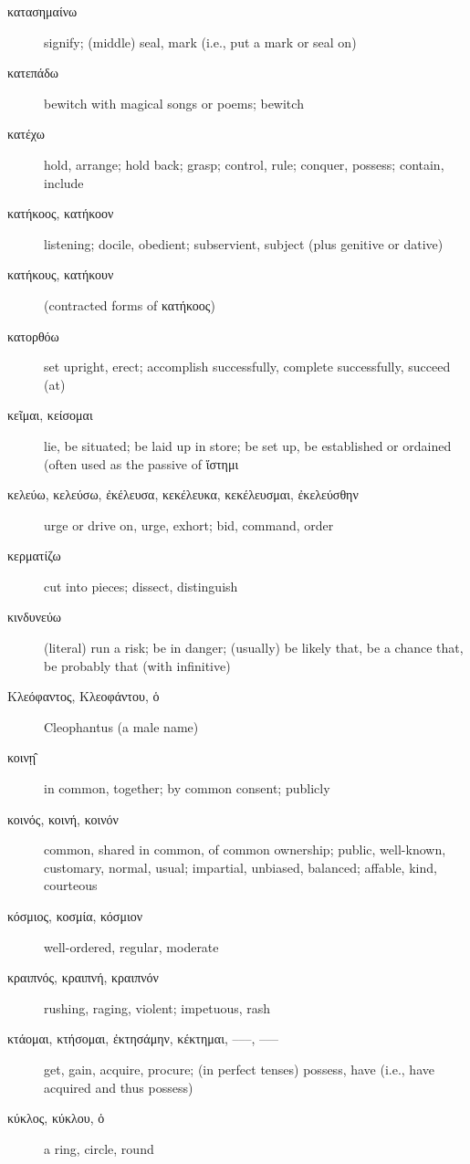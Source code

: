 \documentclass[12pt,letterpaper]{article}
\begin{document}
\begin{description}
    \item[\textgreek{κατασημαίνω}] signify; (middle) seal, mark (i.e., put a mark or seal on)
    \item[\textgreek{κατεπάδω}] bewitch with magical songs or poems; bewitch
    \item[\textgreek{κατέχω}] hold, arrange; hold back; grasp; control, rule; conquer, possess; contain, include
    \item[\textgreek{κατήκοος, κατήκοον}] listening; docile, obedient; subservient, subject (plus genitive or dative)
    \item[\textgreek{κατήκους, κατήκουν}] (contracted forms of \textgreek{κατήκοος})
    \item[\textgreek{κατορθόω}] set upright, erect; accomplish successfully, complete successfully, succeed (at)
    \item[\textgreek{κεῖμαι, κείσομαι}] \marginnote{*}lie, be situated; be laid up in store; be set up, be established or ordained (often used as the passive of \textgreek{ἵστημι}
    \item[\textgreek{κελεύω, κελεύσω, ἐκέλευσα, κεκέλευκα, κεκέλευσμαι, ἐκελεύσθην}] \marginnote{*}urge or drive on, urge, exhort; bid, command, order
    \item[\textgreek{κερματίζω}] cut into pieces; dissect, distinguish
    \item[\textgreek{κινδυνεύω}] (literal) run a risk; be in danger; (usually) be likely that, be a chance that, be probably that (with infinitive)
    \item[\textgreek{Κλεόφαντος, Κλεοφάντου, ὁ}] Cleophantus (a male name)
    \item[\textgreek{κοινῃ̂}] in common, together; by common consent; publicly
    \item[\textgreek{κοινός, κοινή, κοινόν}] \marginnote{*}common, shared in common, of common ownership; public, well-known, customary, normal, usual; impartial, unbiased, balanced; affable, kind, courteous
    \item[\textgreek{κόσμιος, κοσμία, κόσμιον}] well-ordered, regular, moderate
    \item[\textgreek{κραιπνός, κραιπνή, κραιπνόν}] rushing, raging, violent; impetuous, rash
    \item[\textgreek{κτάομαι, κτήσομαι, ἐκτησάμην, κέκτημαι, –––, –––}] \marginnote{*}get, gain, acquire, procure; (in perfect tenses) possess, have (i.e., have acquired and thus possess)
    \item[\textgreek{κύκλος, κύκλου, ὁ}] \marginnote{*}a ring, circle, round

\end{description}
\end{document}
